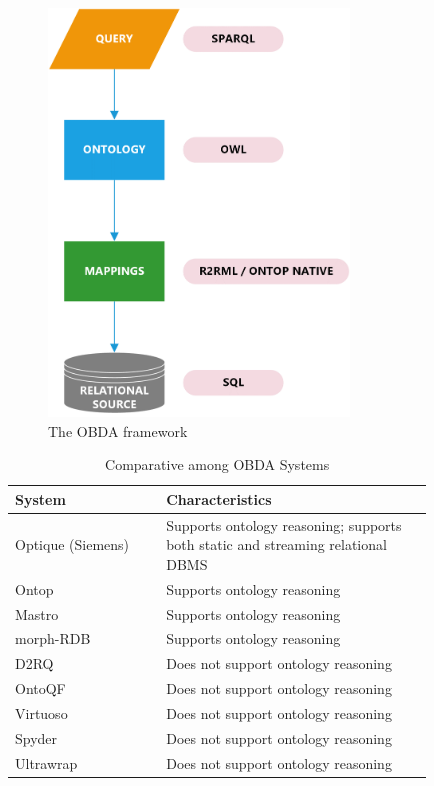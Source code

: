 \begin{figure}[ht]
    \centering
    \includegraphics[width=8cm]{res/data_integration.png}
    \caption{The OBDA framework}
    \label{fig:obda_two}
\end{figure}


\begin{table}[ht]
    \centering
    \begin{tabular}{| p{0.3\linewidth} | p{0.53\linewidth} |}
    \hline
    \textbf{System} & \textbf{Characteristics} \\ \hline
    Optique (Siemens)  & Supports ontology reasoning; supports both static and streaming relational \ac{DBMS} \\ \hline
    Ontop  & Supports ontology reasoning \\ \hline
    Mastro  & Supports ontology reasoning \\ \hline
    morph-RDB  & Supports ontology reasoning \\ \hline
    D2RQ  & Does not support ontology reasoning \\ \hline
    OntoQF  & Does not support ontology reasoning \\ \hline
    Virtuoso  & Does not support ontology reasoning \\ \hline
    Spyder  & Does not support ontology reasoning \\ \hline
    Ultrawrap  & Does not support ontology reasoning \\ \hline
    \end{tabular}
    \caption{Comparative among OBDA Systems \label{tab:obda_comparison}}
\end{table}

